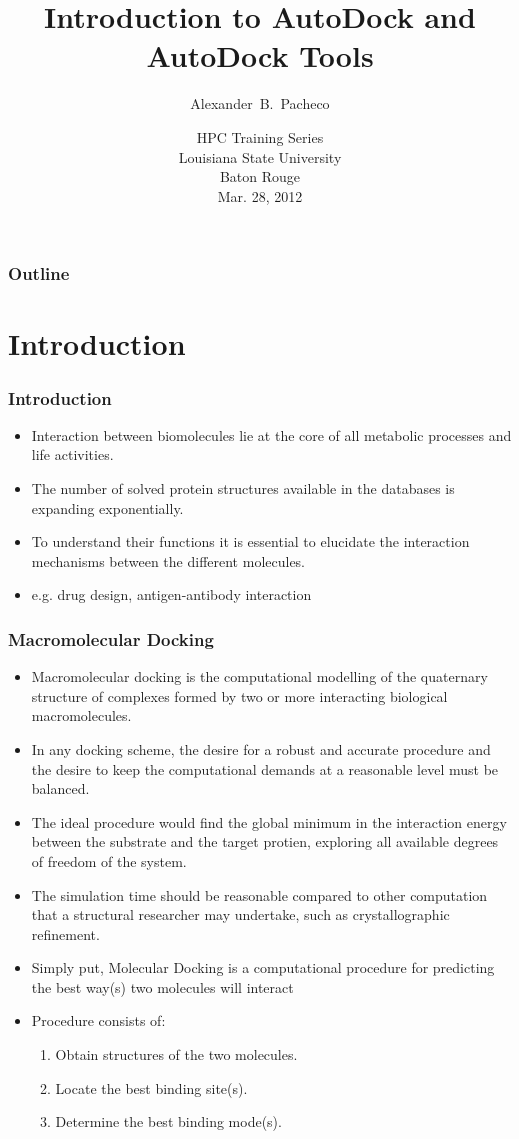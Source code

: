 \documentclass[slidestop,mathserif,compress,xcolor=svgnames]{beamer}
\title[AutoDock]{Introduction to AutoDock and AutoDock Tools}
\author[Alex Pacheco]{\large{Alexander~B.~Pacheco}}
\institute[HPC@LSU - http://www.hpc.lsu.edu] {\inst{}\footnotesize{User Services Consultant\\LSU HPC \& LONI\\sys-help@loni.org}}
\date[{Mar. 28, 2012\hspace{2cm}}]{\scriptsize{HPC Training Series\\Louisiana State University\\Baton Rouge\\Mar. 28, 2012}}
\begin{document}
\scriptsize

\frame{\titlepage}

\begin{frame}[label=toc,squeeze]
  \footnotesize
  \frametitle{\small{Outline}}
  \tableofcontents
\end{frame}

\section{Introduction}
\begin{frame}%
  \frametitle{\small Introduction}
  \begin{itemize}
    \item Interaction between biomolecules lie at the core of all metabolic processes and life activities.
    \item The number of solved protein structures available in the databases is expanding exponentially.
    \item To understand their functions it is essential to elucidate the interaction mechanisms between the different molecules.
    \item e.g. drug design, antigen-antibody interaction
  \end{itemize}
\end{frame}

\begin{frame}
  \frametitle{\small Macromolecular Docking}
  \begin{itemize}
    \item Macromolecular docking is the computational modelling of the quaternary  structure of complexes formed by two or more interacting biological macromolecules.
    \item In any docking scheme, the desire for a robust and accurate procedure and the desire to keep the computational demands at a reasonable level must be balanced.
    \item The ideal procedure would find the global minimum in the interaction energy between the substrate and the target protien, exploring all available degrees of freedom of the system.
    \item The simulation time should be reasonable compared to other computation that a structural researcher may undertake, such as crystallographic refinement.
    \item Simply put, Molecular Docking is a computational procedure for predicting the best way(s) two molecules will interact
    \item Procedure consists of:
    \begin{enumerate}
      \item Obtain structures of the two molecules.
      \item Locate the best binding site(s).
      \item Determine the best binding mode(s).
    \end{enumerate}
  \end{itemize}
\end{frame}
\end{document}
